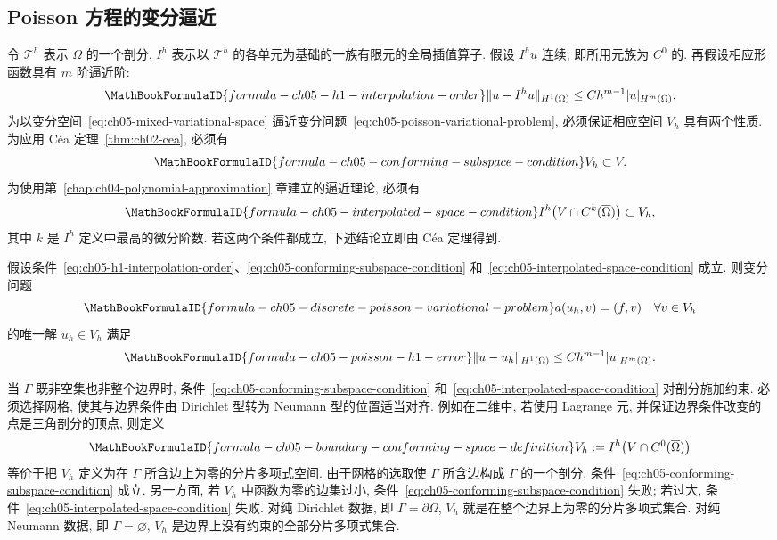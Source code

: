 \subsection{Poisson 方程的变分逼近}
\label{sec:ch05-poisson-variational-approximation}
\setcounter{thmcount}{0}
\setcounter{equation}{0}

令 $\mathcal T^h$ 表示 $\Omega$ 的一个剖分, $I^h$ 表示以 $\mathcal T^h$ 的各单元为基础的一族有限元的全局插值算子. 假设 $I^h u$ 连续, 即所用元族为 $C^0$ 的. 再假设相应形函数具有 $m$ 阶逼近阶:
\begin{equation}
\MathBookFormulaID{formula-ch05-h1-interpolation-order}
\label{eq:ch05-h1-interpolation-order}
\|u-I^h u\|_{H^1(\Omega)}\leq Ch^{m-1}|u|_{H^m(\Omega)}.
\end{equation}
为以变分空间~\eqref{eq:ch05-mixed-variational-space} 逼近变分问题~\eqref{eq:ch05-poisson-variational-problem}, 必须保证相应空间 $V_h$ 具有两个性质. 为应用 Céa 定理~\ref{thm:ch02-cea}, 必须有
\begin{equation}
\MathBookFormulaID{formula-ch05-conforming-subspace-condition}
\label{eq:ch05-conforming-subspace-condition}
V_h\subset V.
\end{equation}
为使用第~\ref{chap:ch04-polynomial-approximation} 章建立的逼近理论, 必须有
\begin{equation}
\MathBookFormulaID{formula-ch05-interpolated-space-condition}
\label{eq:ch05-interpolated-space-condition}
I^h\bigl(V\cap C^k(\overline\Omega)\bigr)\subset V_h,
\end{equation}
其中 $k$ 是 $I^h$ 定义中最高的微分阶数. 若这两个条件都成立, 下述结论立即由 Céa 定理得到.

\begin{Theorem}
\label{thm:ch05-poisson-h1-error}
假设条件~\eqref{eq:ch05-h1-interpolation-order}、\eqref{eq:ch05-conforming-subspace-condition} 和~\eqref{eq:ch05-interpolated-space-condition} 成立. 则变分问题
\[
\MathBookFormulaID{formula-ch05-discrete-poisson-variational-problem}
a(u_h,v)=(f,v)\quad\forall v\in V_h
\]
的唯一解 $u_h\in V_h$ 满足
\[
\MathBookFormulaID{formula-ch05-poisson-h1-error}
\|u-u_h\|_{H^1(\Omega)}\leq Ch^{m-1}|u|_{H^m(\Omega)}.
\]
\end{Theorem}

当 $\Gamma$ 既非空集也非整个边界时, 条件~\eqref{eq:ch05-conforming-subspace-condition} 和~\eqref{eq:ch05-interpolated-space-condition} 对剖分施加约束. 必须选择网格, 使其与边界条件由 Dirichlet 型转为 Neumann 型的位置适当对齐. 例如在二维中, 若使用 Lagrange 元, 并保证边界条件改变的点是三角剖分的顶点, 则定义
\[
\MathBookFormulaID{formula-ch05-boundary-conforming-space-definition}
V_h:=I^h\bigl(V\cap C^0(\overline\Omega)\bigr)
\]
等价于把 $V_h$ 定义为在 $\Gamma$ 所含边上为零的分片多项式空间. 由于网格的选取使 $\Gamma$ 所含边构成 $\Gamma$ 的一个剖分, 条件~\eqref{eq:ch05-conforming-subspace-condition} 成立. 另一方面, 若 $V_h$ 中函数为零的边集过小, 条件~\eqref{eq:ch05-conforming-subspace-condition} 失败; 若过大, 条件~\eqref{eq:ch05-interpolated-space-condition} 失败. 对纯 Dirichlet 数据, 即 $\Gamma=\partial\Omega$, $V_h$ 就是在整个边界上为零的分片多项式集合. 对纯 Neumann 数据, 即 $\Gamma=\varnothing$, $V_h$ 是边界上没有约束的全部分片多项式集合.

